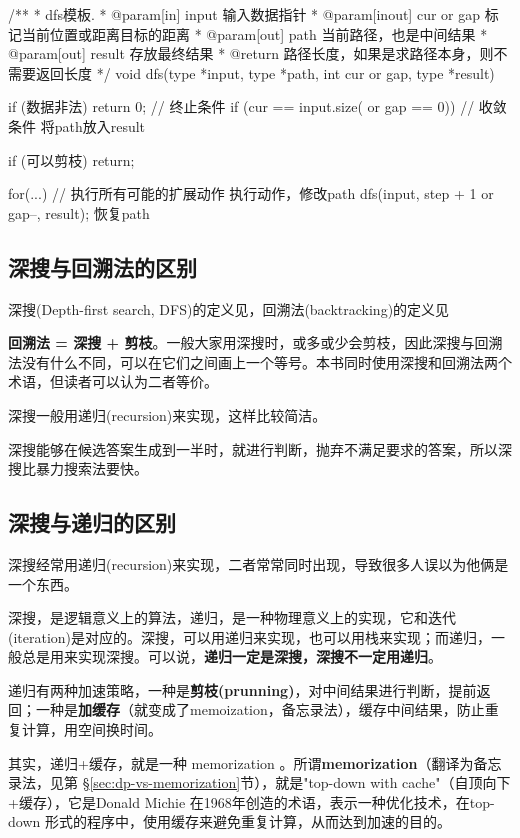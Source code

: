 \begin{Codex}[label=dfs_template.cpp]
/**
 * dfs模板.
 * @param[in] input 输入数据指针
 * @param[inout] cur or gap 标记当前位置或距离目标的距离
 * @param[out] path 当前路径，也是中间结果
 * @param[out] result 存放最终结果
 * @return 路径长度，如果是求路径本身，则不需要返回长度
 */
void dfs(type *input, type *path, int cur or gap, type *result) {
    if (数据非法) return 0;   // 终止条件
    if (cur == input.size( or gap == 0)) { // 收敛条件
        将path放入result
    }

    if (可以剪枝) return;

    for(...) { // 执行所有可能的扩展动作
        执行动作，修改path
        dfs(input, step + 1 or gap--, result);
        恢复path
    }
}
\end{Codex}


\subsection{深搜与回溯法的区别}
深搜(Depth-first search, DFS)的定义见，回溯法(backtracking)的定义见

\textbf{回溯法 = 深搜 + 剪枝}。一般大家用深搜时，或多或少会剪枝，因此深搜与回溯法没有什么不同，可以在它们之间画上一个等号。本书同时使用深搜和回溯法两个术语，但读者可以认为二者等价。

深搜一般用递归(recursion)来实现，这样比较简洁。

深搜能够在候选答案生成到一半时，就进行判断，抛弃不满足要求的答案，所以深搜比暴力搜索法要快。


\subsection{深搜与递归的区别}
深搜经常用递归(recursion)来实现，二者常常同时出现，导致很多人误以为他俩是一个东西。

深搜，是逻辑意义上的算法，递归，是一种物理意义上的实现，它和迭代(iteration)是对应的。深搜，可以用递归来实现，也可以用栈来实现；而递归，一般总是用来实现深搜。可以说，\textbf{递归一定是深搜，深搜不一定用递归}。

递归有两种加速策略，一种是\textbf{剪枝(prunning)}，对中间结果进行判断，提前返回；一种是\textbf{加缓存}（就变成了memoization，备忘录法），缓存中间结果，防止重复计算，用空间换时间。

其实，递归+缓存，就是一种 memorization 。所谓\textbf{memorization}（翻译为备忘录法，见第 \S \ref{sec:dp-vs-memorization}节），就是"top-down with cache"（自顶向下+缓存），它是Donald Michie 在1968年创造的术语，表示一种优化技术，在top-down 形式的程序中，使用缓存来避免重复计算，从而达到加速的目的。

